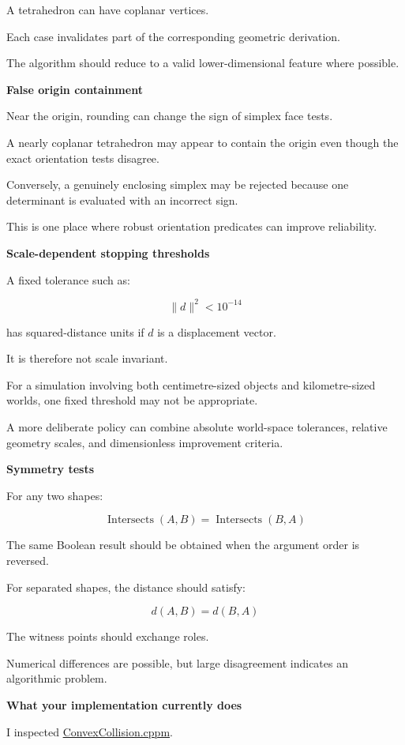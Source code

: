 A tetrahedron can have coplanar vertices.

Each case invalidates part of the corresponding geometric derivation.

The algorithm should reduce to a valid lower-dimensional feature where possible.

\textbf{False origin containment}

Near the origin, rounding can change the sign of simplex face tests.

A nearly coplanar tetrahedron may appear to contain the origin even though the exact orientation tests disagree.

Conversely, a genuinely enclosing simplex may be rejected because one determinant is evaluated with an incorrect sign.

This is one place where robust orientation predicates can improve reliability.

\textbf{Scale-dependent stopping thresholds}

A fixed tolerance such as:

\[
\|d\|^2<10^{-14}
\]

has squared-distance units if \(d\) is a displacement vector.

It is therefore not scale invariant.

For a simulation involving both centimetre-sized objects and kilometre-sized worlds, one fixed threshold may not be appropriate.

A more deliberate policy can combine absolute world-space tolerances, relative geometry scales, and dimensionless improvement criteria.

\textbf{Symmetry tests}

For any two shapes:

\[
\operatorname{Intersects}(A,B) = \operatorname{Intersects}(B,A)
\]

The same Boolean result should be obtained when the argument order is reversed.

For separated shapes, the distance should satisfy:

\[
d(A,B)=d(B,A)
\]

The witness points should exchange roles.

Numerical differences are possible, but large disagreement indicates an algorithmic problem.

\textbf{What your implementation currently does}

I inspected \href{https://github.com/swayam8624/KairoPhysicsEngine/blob/main/ConvexCollision.cppm?utm_source=chatgpt.com}{ConvexCollision.cppm}.

